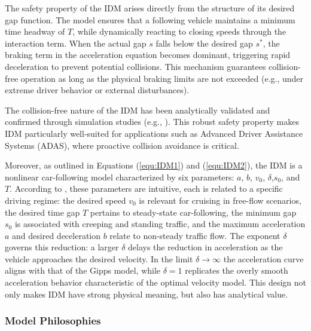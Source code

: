 \documentclass[a4paper,fleqn]{cas-sc}
\begin{document}
The safety property of the IDM arises directly from the structure of its desired gap function. The model ensures that a following vehicle maintains a minimum time headway of $T$, while dynamically reacting to closing speeds through the interaction term. When the actual gap $s$ falls below the desired gap $s^*$, the braking term in the acceleration equation becomes dominant, triggering rapid deceleration to prevent potential collisions. This mechanism guarantees collision-free operation as long as the physical braking limits are not exceeded (e.g., under extreme driver behavior or external disturbances).

The collision-free nature of the IDM has been analytically validated and confirmed through simulation studies (e.g., \cite{treiberTrafficFlowDynamics2013}). This robust safety property makes IDM particularly well-suited for applications such as Advanced Driver Assistance Systems (ADAS), where proactive collision avoidance is critical.

Moreover, as outlined in Equations (\ref{equ:IDM1}) and (\ref{equ:IDM2}), the IDM is a nonlinear car-following model characterized by six parameters: $a$, $b$, $v_0$, $\delta$,$s_0$, and $T$. According to \cite{treiberMicroscopicCalibrationValidationCarFollowing2013}, these parameters are intuitive, each is related to a specific driving regime: the desired speed $v_0$ is relevant for cruising in free-flow scenarios, the desired time gap $T$ pertains to steady-state car-following, the minimum gap $s_0$ is associated with creeping and standing traffic, and the maximum acceleration $a$ and desired deceleration $b$ relate to non-steady traffic flow. The exponent $\delta$ governs this reduction: a larger $\delta$ delays the reduction in acceleration as the vehicle approaches the desired velocity. In the limit $\delta \to \infty$ the acceleration curve aligns with that of the Gipps model, while $\delta=1 $ replicates the overly smooth acceleration behavior characteristic of the optimal velocity model. This design not only makes IDM have strong physical meaning, but also has analytical value. 

\subsubsection{Model Philosophies}
\end{document}
